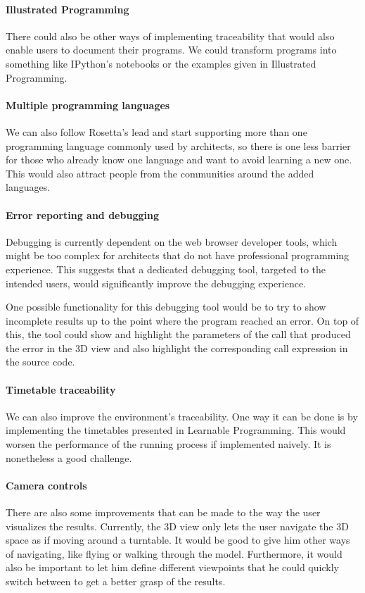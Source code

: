 \paragraph{Illustrated Programming}
There could also be other ways of implementing traceability that would also enable users to document their programs.
We could transform programs into something like IPython's notebooks or the examples given in Illustrated Programming\cite{Leitao2014illustrated}.

\paragraph{Multiple programming languages}
We can also follow Rosetta's lead and start supporting more than one programming language commonly used by architects, so there is one less barrier for those who already know one language and want to avoid learning a new one.
This would also attract people from the communities around the added languages.

\paragraph{Error reporting and debugging}
Debugging is currently dependent on the web browser developer tools, which might be too complex for architects that do not have professional programming experience.
This suggests that a dedicated debugging tool, targeted to the intended users, would significantly improve the debugging experience.

One possible functionality for this debugging tool would be to try to show incomplete results up to the point where the program reached an error.
On top of this, the tool could show and highlight the parameters of the call that produced the error in the 3D view and also highlight the corresponding call expression in the source code.

\paragraph{Timetable traceability}
We can also improve the environment's traceability.
One way it can be done is by implementing the timetables presented in Learnable Programming\cite{victor2012learnable}.
This would worsen the performance of the running process if implemented naively.
It is nonetheless a good challenge.

\paragraph{Camera controls}
There are also some improvements that can be made to the way the user visualizes the results.
Currently, the 3D view only lets the user navigate the 3D space as if moving around a turntable.
It would be good to give him other ways of navigating, like flying or walking through the model.
Furthermore, it would also be important to let him define different viewpoints that he could quickly switch between to get a better grasp of the results.

